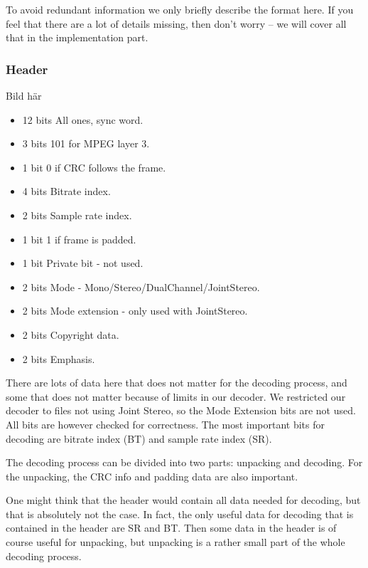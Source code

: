 \documentclass[a4paper,12pt]{article}
\begin{document}
       To avoid redundant information we only briefly describe the format here.
       If you feel that there are a lot of details missing, then don't worry --
       we will cover all that in the implementation part.

       \subsubsection{Header}
       \label{sec:header}
            Bild här \\
            \begin{itemize}
                \item{12 bits} All ones, sync word.
                \item{3 bits} 101 for MPEG layer 3.
                \item{1 bit} 0 if CRC follows the frame.
                \item{4 bits} Bitrate index.
                \item{2 bits} Sample rate index.
                \item{1 bit} 1 if frame is padded.
                \item{1 bit} Private bit - not used.
                \item{2 bits} Mode - Mono/Stereo/DualChannel/JointStereo.
                \item{2 bits} Mode extension - only used with JointStereo.
                \item{2 bits} Copyright data.
                \item{2 bits} Emphasis.
            \end{itemize}

            There are lots of data here that does not matter for the decoding
            process, and some that does not matter because of limits in our
            decoder. We restricted our decoder to files not using Joint Stereo,
            so the Mode Extension bits are not used. All bits are however
            checked for correctness. The most important bits for decoding are
            bitrate index (BT) and sample rate index (SR).

            The decoding process can be divided into two parts: unpacking and
            decoding. For the unpacking, the CRC info and padding data are also
            important.

            One might think that the header would contain all data needed for
            decoding, but that is absolutely not the case. In fact, the only
            useful data for decoding that is contained in the header are SR and
            BT. Then some data in the header is of course useful for unpacking,
            but unpacking is a rather small part of the whole decoding process.
\end{document}
